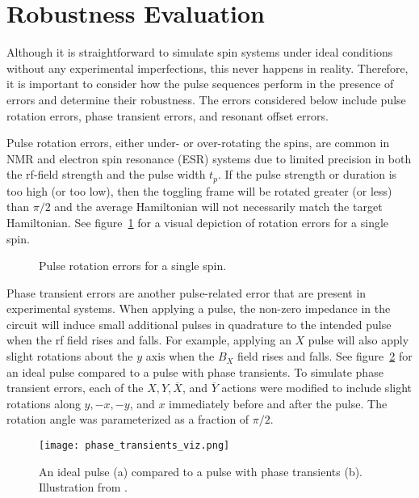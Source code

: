 \section{Robustness Evaluation}

Although it is straightforward to simulate spin systems under ideal conditions without any experimental imperfections, this never happens in reality. Therefore, it is important to consider how the pulse sequences perform in the presence of errors and determine their robustness.
The errors considered below include pulse rotation errors, phase transient errors, and resonant offset errors.

Pulse rotation errors, either under- or over-rotating the spins, are common in NMR and electron spin resonance (ESR) systems due to limited precision in both the rf-field strength and the pulse width $t_p$. If the pulse strength or duration is too high (or too low), then the toggling frame will be rotated greater (or less) than $\pi/2$ and the average Hamiltonian will not necessarily match the target Hamiltonian. See figure~\ref{fig:rotation-error} for a visual depiction of rotation errors for a single spin.

\begin{figure}[H]
    \centering
    
    \caption{Pulse rotation errors for a single spin.}
    \label{fig:rotation-error}
\end{figure}

Phase transient errors are another pulse-related error that are present in experimental systems. When applying a pulse, the non-zero impedance in the circuit will induce small additional pulses in quadrature to the intended pulse when the rf field rises and falls. For example, applying an $X$ pulse will also apply slight rotations about the $y$ axis when the $B_X$ field rises and falls. See figure~\ref{fig:phase_transients} for an ideal pulse compared to a pulse with phase transients. To simulate phase transient errors, each of the $X, Y, \overline{X}$, and $\overline{Y}$ actions were modified to include slight rotations along $y, -x, -y$, and $x$ immediately before and after the pulse. The rotation angle was parameterized as a fraction of $\pi/2$.

\begin{figure}[H]
    \centering
    \texttt{[image: phase\_transients\_viz.png]}
    \caption{
    An ideal pulse (a) compared to a pulse with phase transients (b). Illustration from \cite{1976ii}.
    }
    \label{fig:phase_transients}
\end{figure}

